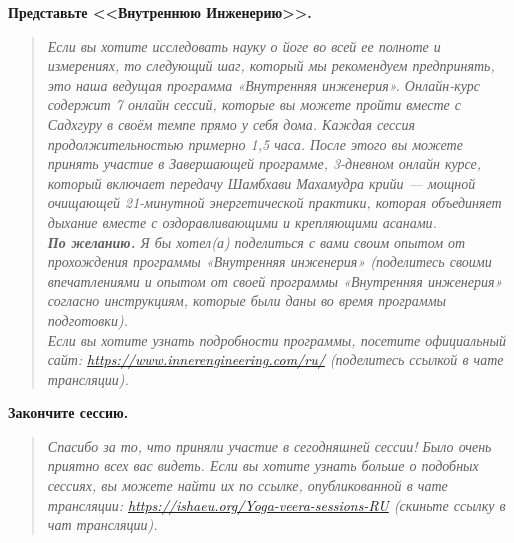 \textbf{Представьте <<Внутреннюю Инженерию>>.}
\begin{quote}\emph{%
\noindent%
Если вы хотите исследовать науку о йоге во всей ее полноте и измерениях,
то следующий шаг, который мы рекомендуем предпринять, это наша
ведущая программа «Внутренняя инженерия». Онлайн-курс содержит 7
онлайн сессий, которые вы можете пройти вместе с Садхгуру в своём
темпе прямо у себя дома. Каждая сессия продолжительностью примерно
1,5 часа. После этого вы можете принять участие в Завершающей
программе, 3-дневном онлайн курсе, который включает передачу
Шамбхави Махамудра крийи — мощной очищающей 21-минутной
энергетической практики, которая объединяет дыхание вместе с
оздоравливающими и крепляющими асанами.
\\[3pt]
\textbf{По желанию.} Я бы хотел(а) поделиться с вами своим опытом от прохождения программы «Внутренняя инженерия» {\color{CadetBlue}(поделитесь своими впечатлениями и опытом от своей программы «Внутренняя инженерия» согласно инструкциям, которые были даны во время программы подготовки)}.
\\[3pt]
Если вы хотите узнать подробности программы, посетите официальный
сайт: \href{http://www.innerengineering.com}{\small https://www.innerengineering.com/ru/} {\color{CadetBlue}(поделитесь ссылкой в чате трансляции)}.
}\end{quote}
\textbf{Закончите сессию.}
\begin{quote}\emph{%
\noindent%
Спасибо за то, что приняли участие в сегодняшней сессии! Было очень приятно всех вас видеть. Если вы хотите узнать больше о подобных сессиях, вы можете найти их по ссылке, опубликованной в чате трансляции: \href{https://ishaeu.org/Yoga-veera-sessions-RU}{\small https://ishaeu.org/Yoga-veera-sessions-RU} {\color{CadetBlue}(скиньте ссылку в чат трансляции)}. 
}\end{quote}


